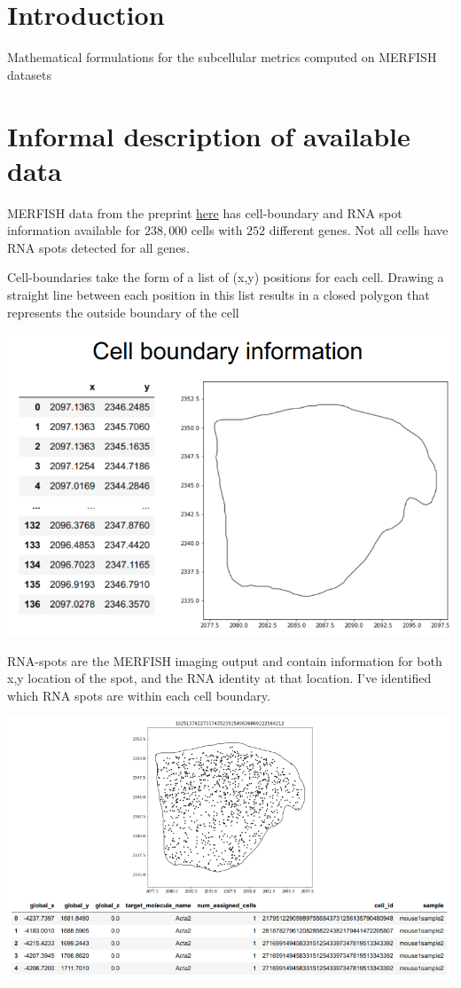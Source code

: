 \documentclass[a4paper,12pt]{article}
\begin{document}
\section{Introduction}

Mathematical formulations for the subcellular metrics computed on MERFISH datasets

\section{Informal description of available data}

MERFISH data from the preprint \href{https://www.biorxiv.org/content/10.1101/2020.06.04.105700v1}{here} has cell-boundary and RNA spot information available for $238,000$ cells with $252$ different genes.
Not all cells have RNA spots detected for all genes.


Cell-boundaries take the form of a list of (x,y) positions for each cell.
Drawing a straight line between each position in this list results in a closed polygon that represents the outside boundary of the cell

\includegraphics[scale=0.35]{boundary_info.png}


RNA-spots are the MERFISH imaging output and contain information for both x,y location of the spot, and the RNA identity at that location.
I've identified which RNA spots are within each cell boundary.

\includegraphics[scale=0.5]{spots_in_cell.png}
\end{document}
